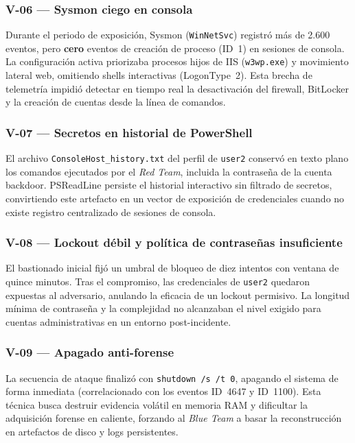 \subsubsection{V-06 --- Sysmon ciego en consola}
Durante el periodo de exposición, Sysmon (\texttt{WinNetSvc}) registró más de 2.600 eventos, pero \textbf{cero} eventos de creación de proceso (ID~1) en sesiones de consola. La configuración activa priorizaba procesos hijos de IIS (\texttt{w3wp.exe}) y movimiento lateral web, omitiendo shells interactivas (LogonType~2). Esta brecha de telemetría impidió detectar en tiempo real la desactivación del firewall, BitLocker y la creación de cuentas desde la línea de comandos.

\subsubsection{V-07 --- Secretos en historial de PowerShell}
El archivo \texttt{ConsoleHost\_}\allowbreak\texttt{history.txt} del perfil de \texttt{user2} conservó en texto plano los comandos ejecutados por el \textit{Red Team}, incluida la contraseña de la cuenta backdoor. PSReadLine persiste el historial interactivo sin filtrado de secretos, convirtiendo este artefacto en un vector de exposición de credenciales cuando no existe registro centralizado de sesiones de consola.

\subsubsection{V-08 --- Lockout débil y política de contraseñas insuficiente}
El bastionado inicial fijó un umbral de bloqueo de diez intentos con ventana de quince minutos. Tras el compromiso, las credenciales de \texttt{user2} quedaron expuestas al adversario, anulando la eficacia de un lockout permisivo. La longitud mínima de contraseña y la complejidad no alcanzaban el nivel exigido para cuentas administrativas en un entorno post-incidente.

\subsubsection{V-09 --- Apagado anti-forense}
La secuencia de ataque finalizó con \texttt{shutdown /s /t 0}, apagando el sistema de forma inmediata (correlacionado con los eventos ID~4647 y ID~1100). Esta técnica busca destruir evidencia volátil en memoria RAM y dificultar la adquisición forense en caliente, forzando al \textit{Blue Team} a basar la reconstrucción en artefactos de disco y logs persistentes.

